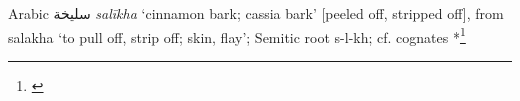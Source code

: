 \begin{etymology}\label{ety:salikha}
Arabic {سليخة} \textit{salīkha} `cinnamon bark; cassia bark' [peeled off, stripped off], from salakha `to pull off, strip off; skin, flay'; Semitic root s-l-kh; cf. cognates *\footnote{\textcite[491]{wehr_dictionary_1976}}
\end{etymology}